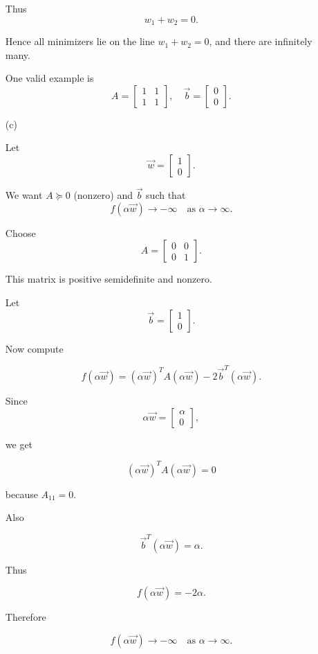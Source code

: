 \documentclass[
  12pt,
]{fphw}
\begin{document}
\begin{enumerate}
Thus
\[
w_1+w_2=0.
\]

Hence all minimizers lie on the line $w_1+w_2=0$, and there are infinitely many.

\medskip
One valid example is
\[
A=
\begin{bmatrix}
1&1\\
1&1
\end{bmatrix},
\quad
\vec b=
\begin{bmatrix}
0\\
0
\end{bmatrix}.
\]

\bigskip

\item[(c)]

Let
\[
\vec w=
\begin{bmatrix}
1\\
0
\end{bmatrix}.
\]

We want $A\succeq0$ (nonzero) and $\vec b$ such that
\[
f(\alpha \vec w)\to -\infty \quad \text{as } \alpha\to\infty.
\]

Choose
\[
A=
\begin{bmatrix}
0&0\\
0&1
\end{bmatrix}.
\]

This matrix is positive semidefinite and nonzero.

Let
\[
\vec b=
\begin{bmatrix}
1\\
0
\end{bmatrix}.
\]

Now compute

\[
f(\alpha \vec w)
=
(\alpha \vec w)^T A (\alpha \vec w)
-
2\vec b^T(\alpha \vec w).
\]

Since
\[
\alpha\vec w=
\begin{bmatrix}
\alpha\\
0
\end{bmatrix},
\]

we get

\[
(\alpha\vec w)^T A (\alpha\vec w)=0
\]

because $A_{11}=0$.

Also

\[
\vec b^T(\alpha\vec w)=\alpha.
\]

Thus

\[
f(\alpha\vec w)=-2\alpha.
\]

Therefore

\[
f(\alpha\vec w)\to -\infty
\quad \text{as } \alpha\to\infty.
\]


\end{enumerate}
\end{document}
